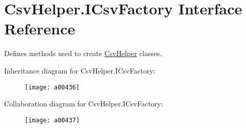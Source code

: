 \hypertarget{a00102}{\section{Csv\-Helper.\-I\-Csv\-Factory Interface Reference}
\label{a00102}
}


Defines methods used to create \hyperlink{a00319}{Csv\-Helper} classes.  




Inheritance diagram for Csv\-Helper.\-I\-Csv\-Factory\-:
\nopagebreak
\begin{figure}[H]
\begin{center}
\leavevmode
\texttt{[image: a00436]}
\end{center}
\end{figure}


Collaboration diagram for Csv\-Helper.\-I\-Csv\-Factory\-:
\nopagebreak
\begin{figure}[H]
\begin{center}
\leavevmode
\texttt{[image: a00437]}
\end{center}
\end{figure}
